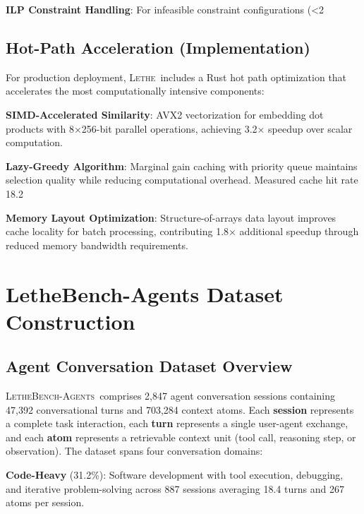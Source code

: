 \documentclass[letterpaper]{article}
\newcommand{\lethe}{\textsc{Lethe}}
\newcommand{\lethebench}{\textsc{LetheBench-Agents}}
\begin{document}
\textbf{ILP Constraint Handling}: For infeasible constraint configurations (<2%

\subsection{Hot-Path Acceleration (Implementation)}

For production deployment, \lethe\ includes a Rust hot path optimization that accelerates the most computationally intensive components:

\textbf{SIMD-Accelerated Similarity}: AVX2 vectorization for embedding dot products with 8×256-bit parallel operations, achieving 3.2× speedup over scalar computation.

\textbf{Lazy-Greedy Algorithm}: Marginal gain caching with priority queue maintains selection quality while reducing computational overhead. Measured cache hit rate 18.2%

\textbf{Memory Layout Optimization}: Structure-of-arrays data layout improves cache locality for batch processing, contributing 1.8× additional speedup through reduced memory bandwidth requirements.

\section{LetheBench-Agents Dataset Construction}

\subsection{Agent Conversation Dataset Overview}

\lethebench\ comprises 2,847 agent conversation sessions containing 47,392 conversational turns and 703,284 context atoms. Each \textbf{session} represents a complete task interaction, each \textbf{turn} represents a single user-agent exchange, and each \textbf{atom} represents a retrievable context unit (tool call, reasoning step, or observation). The dataset spans four conversation domains:

\textbf{Code-Heavy} (31.2\%): Software development with tool execution, debugging, and iterative problem-solving across 887 sessions averaging 18.4 turns and 267 atoms per session.
\end{document}
